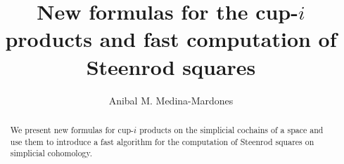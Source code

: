 \documentclass{amsart}
\theoremstyle{definition}
\begin{document}
	
	\title{New formulas for the cup-$i$ products and fast computation of Steenrod squares}
	\author{Anibal M. Medina-Mardones}
	\address{Department of Mathematics, University of Notre Dame}
	
	\begin{abstract}
		We present new formulas for cup-$i$ products on the simplicial cochains of a space and use them to introduce a fast algorithm for the computation of Steenrod squares on simplicial cohomology.
	\end{abstract}
	
	\maketitle
	\tableofcontents	
	
	
	
	
	
	
	
	
	
	
\end{document}
